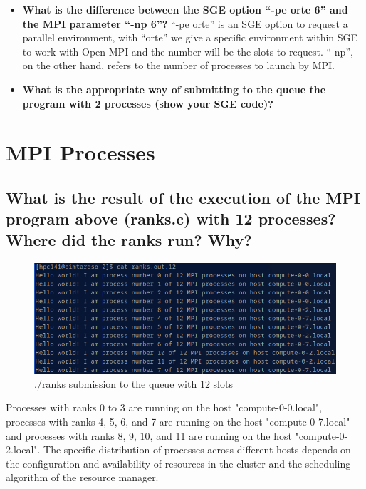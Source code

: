 \documentclass[11pt]{article}
\begin{document}
\begin{itemize}
  \item \textbf{What is the difference between the SGE option “-pe orte 6” and the MPI parameter “-np 6”?}
  ``-pe orte'' is an SGE option to request a parallel environment, with ``orte'' we give a specific environment within SGE to work with Open MPI and the number will be the slots to request. ``-np'', on the other hand, refers to the number of processes to launch by MPI.
  \item \textbf{What is the appropriate way of submitting to the queue the program with 2 processes (show your SGE code)?}
    
\end{itemize}

\hypertarget{2}{%
\section{MPI Processes}\label{2}}

\subsection*{What is the result of the execution of the MPI program above (ranks.c) with 12 processes? Where did the ranks run? Why?}


\begin{figure}[h!]
    \centering
    \includegraphics{ranks12.png}
    \caption*{./ranks submission to the queue with 12 slots}
    \label{fig:2}
\end{figure}

Processes with ranks 0 to 3 are running on the host "compute-0-0.local", processes with ranks 4, 5, 6, and 7 are running on the host "compute-0-7.local" and processes with ranks 8, 9, 10, and 11 are running on the host "compute-0-2.local".
The specific distribution of processes across different hosts depends on the configuration and availability of resources in the cluster and the scheduling algorithm of the resource manager.
\end{document}
